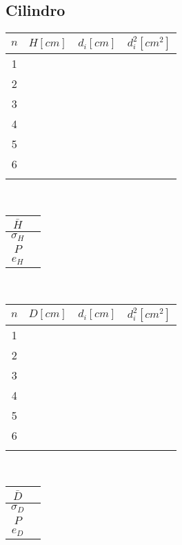 \documentclass[letter,twoside,11pt]{article}
\begin{document}
\subsection{Cilindro}
\begin{tabular}{|c|>{\centering}m{2.0cm}<{\centering}
                  |>{\centering}m{2.0cm}<{\centering}
                  |>{\centering}m{2.0cm}<{\centering}|}
\hline
\textbf{$n$} & \textbf{$H[cm]$}
             & \textbf{$d_i[cm]$}
             & \textbf{$d_i^2[cm^2]$} \tabularnewline \hline
1 & & & \\ \hline
2 & & & \\ \hline
3 & & & \\ \hline
4 & & & \\ \hline
5 & & & \\ \hline
6 & & & \\ \hline
 & & & \\ \hline
\end{tabular}\\

\vspace{0.5cm}
\begin{tabular}{|c|p{2.0cm}|}
\hline
$\bar{H}$ & \\ \hline
$\sigma_H$ & \\ \hline
$P$ & \\ \hline
$e_H$ & \\ \hline
\end{tabular}\\

\begin{tabular}{|c|>{\centering}m{2.0cm}<{\centering}
                  |>{\centering}m{2.0cm}<{\centering}
                  |>{\centering}m{2.0cm}<{\centering}|}
\hline
\textbf{$n$} & \textbf{$D[cm]$}
             & \textbf{$d_i[cm]$}
             & \textbf{$d_i^2[cm^2]$} \tabularnewline \hline
1 & & & \\ \hline
2 & & & \\ \hline
3 & & & \\ \hline
4 & & & \\ \hline
5 & & & \\ \hline
6 & & & \\ \hline
 & & & \\ \hline
\end{tabular}\\

\vspace{0.5cm}
\begin{tabular}{|c|p{2.0cm}|}
\hline
$\bar{D}$ & \\ \hline
$\sigma_D$ & \\ \hline
$P$ & \\ \hline
$e_D$ & \\ \hline
\end{tabular}\\
\end{document}
